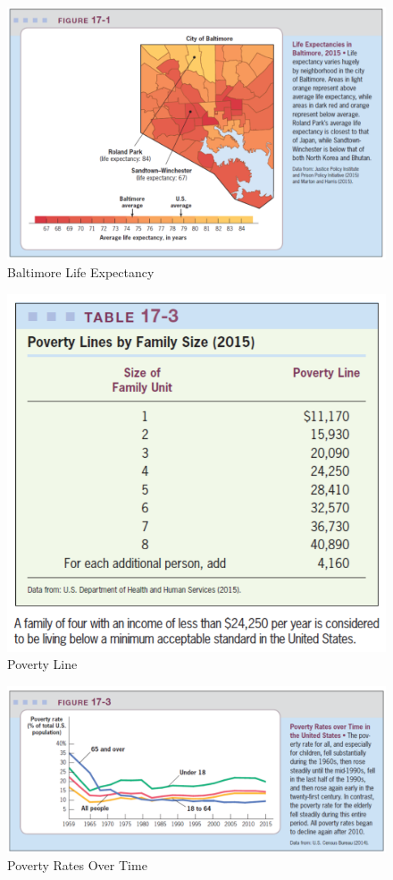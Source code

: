 \documentclass{article}
\begin{document}
\begin{figure}[H]
    \centering
    \includegraphics[scale=0.45]{"Baltimore Life Expectancy"}
    \caption{Baltimore Life Expectancy}
\end{figure}

\begin{figure}[H]
    \centering
    \includegraphics[scale=0.60]{"Poverty Line"}
    \caption{Poverty Line}
\end{figure}

\begin{figure}[H]
    \centering
    \includegraphics[scale=0.45]{"Poverty Rates Over Time"}
    \caption{Poverty Rates Over Time}
\end{figure}
\end{document}
